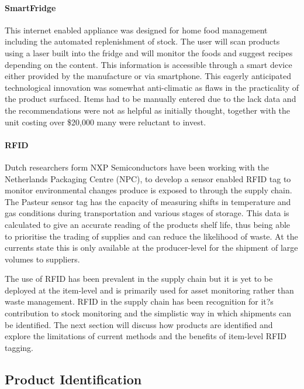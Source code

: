\documentclass[a4paper, 11pt]{article}
\begin{document}
\paragraph{SmartFridge}
This internet enabled appliance was designed for home food management including the automated replenishment of stock. The user will scan products using a laser built into the fridge and will monitor the foods and suggest recipes depending on the content. This information is accessible through a smart device either provided by the manufacture or via smartphone. This eagerly anticipated technological innovation was somewhat anti-climatic as flaws in the practicality of the product surfaced. Items had to be manually entered due to the lack data and the recommendations were not as helpful as initially thought, together with the unit costing over \$20,000 many were reluctant to invest.

\paragraph{RFID}
Dutch researchers form NXP Semiconductors have been working with the Netherlands Packaging Centre (NPC),  to develop a sensor enabled RFID tag to monitor environmental changes produce is exposed to through the supply chain. The Pasteur sensor tag has the capacity of measuring shifts in temperature and gas conditions during transportation and various stages of storage. This data is calculated to give an accurate reading of the products shelf life, thus being able to prioritise the trading of supplies and can reduce the likelihood of waste. At the currents state this is only available at the producer-level for the shipment of large volumes to suppliers. 

The use of RFID has been prevalent in the supply chain but it is yet to be deployed at the item-level and is primarily used for asset monitoring rather than waste management. RFID in the supply chain has been recognition for it?s contribution to stock monitoring and the simplistic way in which shipments can be identified. The next section will discuss how products are identified and explore the limitations of current methods and the benefits of item-level RFID tagging. 


\vspace{\baselineskip}
\vspace{\baselineskip}
\vspace{\baselineskip}

\subsection{Product Identification}
\end{document}
